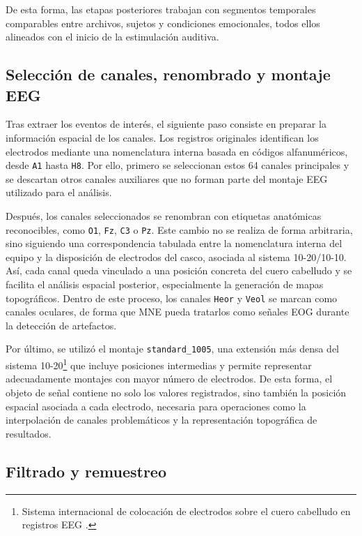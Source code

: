 De esta forma, las etapas posteriores trabajan con segmentos temporales comparables entre archivos, sujetos y condiciones emocionales, todos ellos alineados con el inicio de la estimulación auditiva.


\subsection{Selección de canales, renombrado y montaje EEG}

Tras extraer los eventos de interés, el siguiente paso consiste en preparar la información espacial de los canales. Los registros originales identifican los electrodos mediante una nomenclatura interna basada en códigos alfanuméricos, desde \texttt{A1} hasta \texttt{H8}. Por ello, primero se seleccionan estos 64 canales principales y se descartan otros canales auxiliares que no forman parte del montaje \ac{EEG} utilizado para el análisis.

Después, los canales seleccionados se renombran con etiquetas anatómicas reconocibles, como \texttt{O1}, \texttt{Fz}, \texttt{C3} o \texttt{Pz}. Este cambio no se realiza de forma arbitraria, sino siguiendo una correspondencia tabulada entre la nomenclatura interna del equipo y la disposición de electrodos del casco, asociada al sistema 10-20/10-10. Así, cada canal queda vinculado a una posición concreta del cuero cabelludo y se facilita el análisis espacial posterior, especialmente la generación de mapas topográficos. Dentro de este proceso, los canales \texttt{Heor} y \texttt{Veol} se marcan como canales oculares, de forma que MNE pueda tratarlos como señales \ac{EOG} durante la detección de artefactos.

Por último, se utilizó el montaje \texttt{standard\_1005}, una extensión más densa del sistema 10-20\footnote{Sistema internacional de colocación de electrodos sobre el cuero cabelludo en registros \ac{EEG} \cite{wikipedia1020System}.} que incluye posiciones intermedias y permite representar adecuadamente montajes con mayor número de electrodos. De esta forma, el objeto de señal contiene no solo los valores registrados, sino también la posición espacial asociada a cada electrodo, necesaria para operaciones como la interpolación de canales problemáticos y la representación topográfica de resultados.


\subsection{Filtrado y remuestreo}

